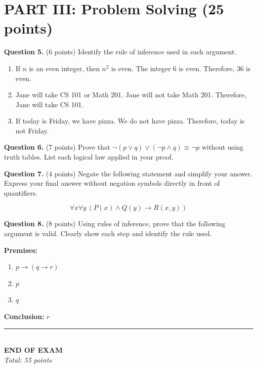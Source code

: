 \documentclass[11pt,a4paper]{article}
\begin{document}
\newpage

\section*{PART III: Problem Solving (25 points)}

\textbf{Question 5.} (6 points) Identify the rule of inference used in each argument.

\begin{enumerate}[label=(\roman*)]
    \item If $n$ is an even integer, then $n^2$ is even. The integer 6 is even. Therefore, $36$ is even.
    
    \vspace{40pt}
    
    \item Jane will take CS 101 or Math 201. Jane will not take Math 201. Therefore, Jane will take CS 101.
    
    \vspace{40pt}
    
    \item If today is Friday, we have pizza. We do not have pizza. Therefore, today is not Friday.
    
    \vspace{40pt}
\end{enumerate}

\textbf{Question 6.} (7 points) Prove that $\neg(p \lor q) \lor (\neg p \land q) \equiv \neg p$ without using truth tables. List each logical law applied in your proof.

\vspace{120pt}

\textbf{Question 7.} (4 points) Negate the following statement and simplify your answer. Express your final answer without negation symbols directly in front of quantifiers.

$$\forall x \forall y\, (P(x) \land Q(y) \to R(x, y))$$

\vspace{80pt}

\textbf{Question 8.} (8 points) Using rules of inference, prove that the following argument is valid. Clearly show each step and identify the rule used.

\textbf{Premises:}
\begin{enumerate}[noitemsep]
    \item $p \to (q \to r)$
    \item $p$
    \item $q$
\end{enumerate}

\textbf{Conclusion:} $r$

\vspace{100pt}

\begin{center}
\rule{0.5\textwidth}{0.5pt}\\[5pt]
\textbf{END OF EXAM}\\[3pt]
\textit{Total: 55 points}
\end{center}
\end{document}
